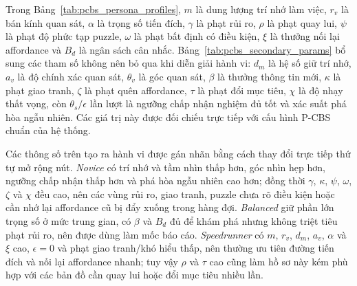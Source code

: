 \documentclass[oneside,a4paper,12pt]{extreport}
\begin{document}
Trong Bảng~\ref{tab:pcbs_persona_profiles}, $m$ là dung lượng trí nhớ làm việc, $r_v$ là bán kính quan sát, $\alpha$ là trọng số tiến đích, $\gamma$ là phạt rủi ro, $\rho$ là phạt quay lui, $\psi$ là phạt độ phức tạp puzzle, $\omega$ là phạt bất định có điều kiện, $\xi$ là thưởng nối lại affordance và $B_d$ là ngân sách cân nhắc. Bảng~\ref{tab:pcbs_secondary_params} bổ sung các tham số không nên bỏ qua khi diễn giải hành vi: $d_m$ là hệ số giữ trí nhớ, $a_v$ là độ chính xác quan sát, $\theta_v$ là góc quan sát, $\beta$ là thưởng thông tin mới, $\kappa$ là phạt giao tranh, $\zeta$ là phạt quên affordance, $\tau$ là phạt đổi mục tiêu, $\chi$ là độ nhạy thất vọng, còn $\theta_s/\epsilon$ lần lượt là ngưỡng chấp nhận nghiệm đủ tốt và xác suất phá hòa ngẫu nhiên. Các giá trị này được đối chiếu trực tiếp với cấu hình P-CBS chuẩn của hệ thống.

Các thông số trên tạo ra hành vi được gán nhãn bằng cách thay đổi trực tiếp thứ tự mở rộng nút. \emph{Novice} có trí nhớ và tầm nhìn thấp hơn, góc nhìn hẹp hơn, ngưỡng chấp nhận thấp hơn và phá hòa ngẫu nhiên cao hơn; đồng thời $\gamma$, $\kappa$, $\psi$, $\omega$, $\zeta$ và $\chi$ đều cao, nên các vùng rủi ro, giao tranh, puzzle chưa rõ điều kiện hoặc cần nhớ lại affordance cũ bị đẩy xuống trong hàng đợi. \emph{Balanced} giữ phần lớn trọng số ở mức trung gian, có $\beta$ và $B_d$ đủ để khám phá nhưng không triệt tiêu phạt rủi ro, nên được dùng làm mốc báo cáo. \emph{Speedrunner} có $m$, $r_v$, $d_m$, $a_v$, $\alpha$ và $\xi$ cao, $\epsilon=0$ và phạt giao tranh/khó hiểu thấp, nên thường ưu tiên đường tiến đích và nối lại affordance nhanh; tuy vậy $\rho$ và $\tau$ cao cũng làm hồ sơ này kém phù hợp với các bản đồ cần quay lui hoặc đổi mục tiêu nhiều lần.
\end{document}
